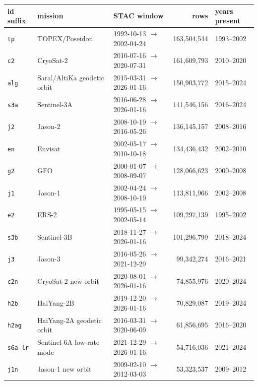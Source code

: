 \documentclass[10pt]{article}
\newcommand{\code}[1]{\texttt{#1}}
\begin{document}
\begin{table}[h]
\centering\setlength{\tabcolsep}{4pt}\footnotesize
\begin{tabular}{@{}lllrl@{}}
\toprule
id suffix & mission & STAC window & rows & years present \\
\midrule
\code{tp}     & TOPEX/Poseidon                & 1992-10-13 $\to$ 2002-04-24 & 163,504,544 & 1993--2002 \\
\code{c2}     & CryoSat-2                     & 2010-07-16 $\to$ 2020-07-31 & 161,609,793 & 2010--2020 \\
\code{alg}    & Saral/AltiKa geodetic orbit   & 2015-03-31 $\to$ 2026-01-16 & 150,903,772 & 2015--2024 \\
\code{s3a}    & Sentinel-3A                   & 2016-06-28 $\to$ 2026-01-16 & 141,546,156 & 2016--2024 \\
\code{j2}     & Jason-2                       & 2008-10-19 $\to$ 2016-05-26 & 136,145,157 & 2008--2016 \\
\code{en}     & Envisat                       & 2002-05-17 $\to$ 2010-10-18 & 134,436,432 & 2002--2010 \\
\code{g2}     & GFO                           & 2000-01-07 $\to$ 2008-09-07 & 128,066,623 & 2000--2008 \\
\code{j1}     & Jason-1                       & 2002-04-24 $\to$ 2008-10-19 & 113,811,966 & 2002--2008 \\
\code{e2}     & ERS-2                         & 1995-05-15 $\to$ 2002-05-14 & 109,297,139 & 1995--2002 \\
\code{s3b}    & Sentinel-3B                   & 2018-11-27 $\to$ 2026-01-16 & 101,296,799 & 2018--2024 \\
\code{j3}     & Jason-3                       & 2016-05-26 $\to$ 2021-12-29 & 99,342,274  & 2016--2021 \\
\code{c2n}    & CryoSat-2 new orbit           & 2020-08-01 $\to$ 2026-01-16 & 74,855,976  & 2020--2024 \\
\code{h2b}    & HaiYang-2B                    & 2019-12-20 $\to$ 2026-01-16 & 70,829,087  & 2019--2024 \\
\code{h2ag}   & HaiYang-2A geodetic orbit     & 2016-03-31 $\to$ 2020-06-09 & 61,856,695  & 2016--2020 \\
\code{s6a-lr} & Sentinel-6A low-rate mode     & 2021-12-29 $\to$ 2026-01-16 & 54,716,036  & 2021--2024 \\
\code{j1n}    & Jason-1 new orbit             & 2009-02-10 $\to$ 2012-03-03 & 53,323,537  & 2009--2012 \\

\end{tabular}
\end{table}
\end{document}
